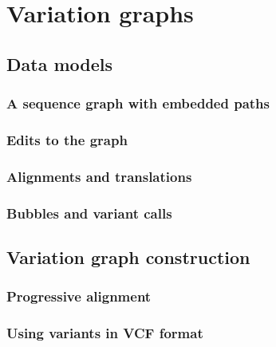 
\chapter{Variation graphs}

\ifpdf
    \graphicspath{{Chapter2/Figs/Raster/}{Chapter2/Figs/PDF/}{Chapter2/Figs/}}
\else
    \graphicspath{{Chapter2/Figs/Vector/}{Chapter2/Figs/}}
\fi


\section{Data models}

\subsection{A sequence graph with embedded paths}

\subsection{Edits to the graph}

\subsection{Alignments and translations}

\subsection{Bubbles and variant calls}

\section{Variation graph construction}

\subsection{Progressive alignment}

\subsection{Using variants in VCF format}

